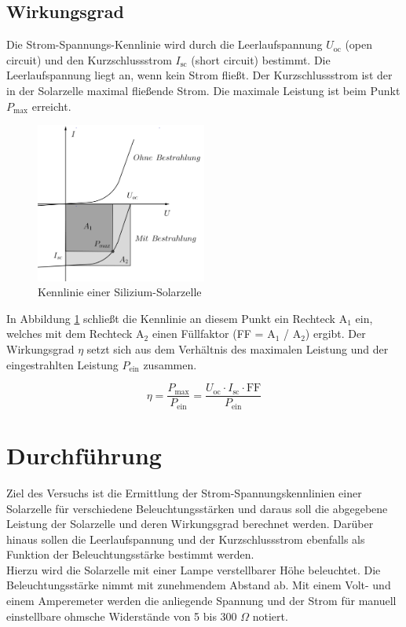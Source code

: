\subsection{Wirkungsgrad}
Die Strom-Spannungs-Kennlinie wird durch die Leerlaufspannung $U_{\text{oc}}$ (open circuit) und den Kurzschlussstrom $I_{\text{sc}}$
(short circuit) bestimmt. Die Leerlaufspannung liegt an, wenn kein Strom fließt. Der Kurzschlussstrom ist der in der Solarzelle maximal
fließende Strom. Die maximale Leistung ist beim Punkt $P_{\text{max}}$ erreicht. 

\begin{figure}[h]
\includegraphics[width=0.5\textwidth]{pics/sol2.png}
\caption{Kennlinie einer Silizium-Solarzelle}
\label{Kennlinie}
\end{figure}

In Abbildung \ref{Kennlinie} schließt die Kennlinie an
diesem Punkt ein Rechteck A$_1$ ein, welches mit dem Rechteck A$_2$ einen Füllfaktor (FF = A$_1$ / A$_2$) ergibt. Der Wirkungsgrad $\eta$
setzt sich aus dem Verhältnis des maximalen Leistung und der eingestrahlten Leistung $P_{\text{ein}}$ zusammen.

\begin{equation}
 \eta = \frac{P_{\text{max}}}{P_{\text{ein}}} = \frac{U_{\text{oc}}\cdot I_{\text{sc}}\cdot \text{FF}}{P_{\text{ein}}}
\end{equation}

\section{Durchführung}
Ziel des Versuchs ist die Ermittlung der Strom-Spannungskennlinien einer Solarzelle für verschiedene Beleuchtungsstärken und daraus soll
die abgegebene Leistung der Solarzelle und deren Wirkungsgrad berechnet werden. Darüber hinaus sollen die Leerlaufspannung und der Kurzschlussstrom 
ebenfalls als Funktion der Beleuchtungsstärke bestimmt werden.\\
Hierzu wird die Solarzelle mit einer Lampe verstellbarer Höhe beleuchtet. Die Beleuchtungsstärke nimmt mit zunehmendem Abstand ab. 
Mit einem Volt- und einem Amperemeter werden die anliegende Spannung und der Strom für manuell einstellbare ohmsche Widerstände von 5 bis 300 $\Omega$ notiert. 

